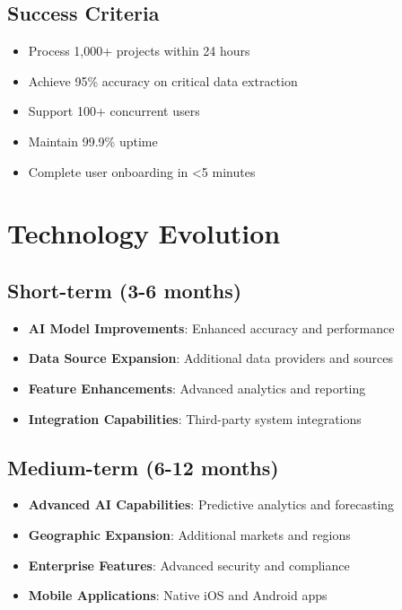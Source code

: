 \documentclass[business]{../templates/infraradar-main}
\begin{document}
\subsection{Success Criteria}
\begin{itemize}
    \item Process 1,000+ projects within 24 hours
    \item Achieve 95\% accuracy on critical data extraction
    \item Support 100+ concurrent users
    \item Maintain 99.9\% uptime
    \item Complete user onboarding in <5 minutes
\end{itemize}

\section{Technology Evolution}

\subsection{Short-term (3-6 months)}
\begin{itemize}
    \item \textbf{AI Model Improvements}: Enhanced accuracy and performance
    \item \textbf{Data Source Expansion}: Additional data providers and sources
    \item \textbf{Feature Enhancements}: Advanced analytics and reporting
    \item \textbf{Integration Capabilities}: Third-party system integrations
\end{itemize}

\subsection{Medium-term (6-12 months)}
\begin{itemize}
    \item \textbf{Advanced AI Capabilities}: Predictive analytics and forecasting
    \item \textbf{Geographic Expansion}: Additional markets and regions
    \item \textbf{Enterprise Features}: Advanced security and compliance
    \item \textbf{Mobile Applications}: Native iOS and Android apps
\end{itemize}
\end{document}
